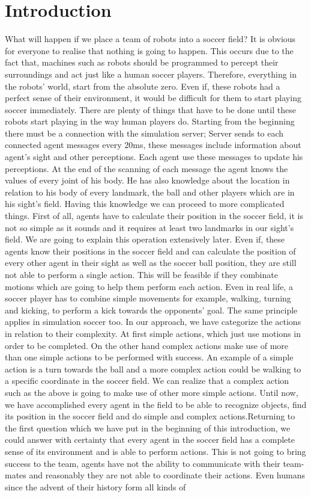 \chapter{Introduction}
\label{intro}
What will happen if we place a team of robots into a soccer field? It is obvious for everyone to realise that nothing is going to happen. This occurs due to the fact that, machines such as robots should be programmed to percept their surroundings and act just like a human soccer players. Therefore, everything in the robots' world, start from the absolute zero. Even if, these robots had a perfect sense of their environment, it would be difficult for them to start playing soccer immediately. There are plenty of things that have to be done until these robots start playing in the way human players do. Starting from the beginning there must be a connection with the simulation server; Server sends to each connected agent messages every 20ms, these messages include information about agent's sight and other perceptions. Each agent use these messages to update his perceptions. At the end of the scanning of each message the agent knows the values of every joint of his body. He has also knowledge about the location in relation to his body of every landmark, the ball and other players which are in his sight's field. Having this knowledge we can proceed to more complicated things. First of all, agents have to calculate their position in the soccer field, it is not so simple as it sounds and it requires at least two landmarks in our sight's field. We are going to explain this operation extensively later. Even if, these agents know their positions in the soccer field and can calculate the position of every other agent in their sight  as well as the soccer ball position, they are still not able to perform a single action. This will be feasible if they combinate motions which are going to help them perform each action. Even in real life, a soccer player  has to combine simple movements for example, walking, turning and kicking, to perform a kick towards the opponents' goal. The same principle applies in simulation soccer too. In our approach, we have categorize the actions in relation to their complexity. At first simple actions, which just use motions in order to be completed. On the other hand complex actions make use of more than one simple actions to be performed with success. An example of a simple action is a turn towards the ball and a more complex action could be walking to a specific coordinate in the soccer field. We can realize that a complex action such as the above is going to make use of other more simple actions. Until now, we have accomplished every agent in the field to be able to recognize objects, find its position in the soccer field and do simple and complex actions.Returning to the first question which we have put in the  beginning of this introduction, we could answer with certainty that every agent in the soccer field has a complete sense of its environment and is able to perform actions. This is not going to bring success to the team, agents have not the ability to communicate with their team-mates and reasonably they are not able to coordinate their actions. Even humans since the advent of their history form all kinds of 